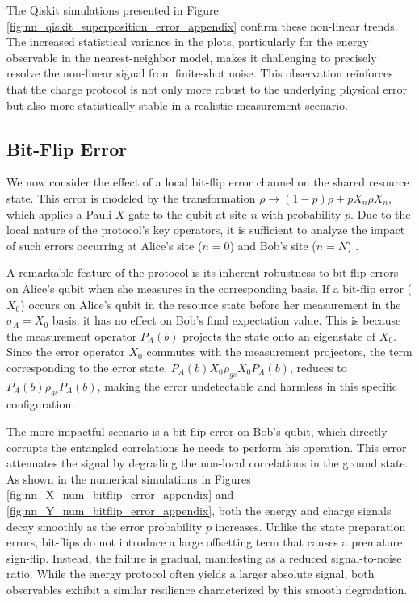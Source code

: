 The Qiskit simulations presented in Figure \ref{fig:nn_qiskit_superposition_error_appendix} confirm these non-linear trends. The increased statistical variance in the plots, particularly for the energy observable in the nearest-neighbor model, makes it challenging to precisely resolve the non-linear signal from finite-shot noise. This observation reinforces that the charge protocol is not only more robust to the underlying physical error but also more statistically stable in a realistic measurement scenario.

\subsection{Bit-Flip Error}



We now consider the effect of a local bit-flip error channel on the shared resource state. This error is modeled by the transformation $\rho \rightarrow (1-p)\rho + pX_{n}\rho X_{n}$, which applies a Pauli-\(X\) gate to the qubit at site $n$ with probability $p$. Due to the local nature of the protocol's key operators, it is sufficient to analyze the impact of such errors occurring at Alice's site ($n=0$) and Bob's site ($n=N$) \cite{QKDbyQET}.

A remarkable feature of the protocol is its inherent robustness to bit-flip errors on Alice's qubit when she measures in the corresponding basis. If a bit-flip error ($X_0$) occurs on Alice's qubit in the resource state before her measurement in the $\sigma_A = X_0$ basis, it has no effect on Bob's final expectation value. This is because the measurement operator $P_A(b)$ projects the state onto an eigenstate of $X_0$. Since the error operator $X_0$ commutes with the measurement projectors, the term corresponding to the error state, $P_A(b)X_0\rho_{gs}X_0P_A(b)$, reduces to $P_A(b)\rho_{gs}P_A(b)$, making the error undetectable and harmless in this specific configuration.

The more impactful scenario is a bit-flip error on Bob's qubit, which directly corrupts the entangled correlations he needs to perform his operation. This error attenuates the signal by degrading the non-local correlations in the ground state. As shown in the numerical simulations in Figures \ref{fig:nn_X_num_bitflip_error_appendix} and \ref{fig:nn_Y_num_bitflip_error_appendix}, both the energy and charge signals decay smoothly as the error probability $p$ increases. Unlike the state preparation errors, bit-flips do not introduce a large offsetting term that causes a premature sign-flip. Instead, the failure is gradual, manifesting as a reduced signal-to-noise ratio. While the energy protocol often yields a larger absolute signal, both observables exhibit a similar resilience characterized by this smooth degradation.

